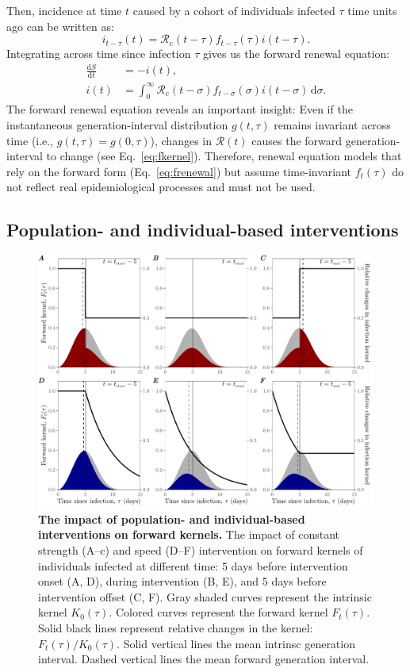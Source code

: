 \documentclass[12pt]{article}
\newcommand{\eref}[1]{Eq.~\ref{eq:#1}}
\newcommand{\Rx}[1]{\ensuremath{{\mathcal R}_{#1}}\xspace}
\newcommand{\Rc}{\Rx{\mathrm{c}}}
\newcommand{\RR}{\ensuremath{{\mathcal R}}\xspace}
\newcommand{\dd}[1]{\ensuremath{\, \mathrm{d}#1}}
\newcommand{\dsigma}{\dd{\sigma}}
\begin{document}
Then, incidence at time $t$ caused by a cohort of individuals infected $\tau$ time units ago can be written as:
\begin{equation}
i_{t-\tau}(t) = \Rc(t-\tau) f_{t-\tau}(\tau) i(t-\tau).
\end{equation}
Integrating across time since infection $\tau$ gives us the forward renewal equation:
\begin{align}
\frac{\mathrm{d}S}{\mathrm{d}t} &= - i(t),\\
i(t) &= \int_0^\infty \Rc(t-\sigma) f_{t-\sigma}(\sigma) i(t-\sigma) \dsigma.
\label{eq:frenewal}
\end{align}
The forward renewal equation reveals an important insight: Even if the instantaneous generation-interval distribution $g(t, \tau)$ remains invariant across time (i.e., $g(t, \tau) = g(0, \tau)$), changes in $\RR(t)$ causes the forward generation-interval to change (see \eref{fkernel}).
Therefore, renewal equation models that rely on the forward form (\eref{frenewal}) but assume time-invariant $f_t(\tau)$ do not reflect real epidemiological processes and must not be used.

\subsection{Population- and individual-based interventions}

\begin{figure}[!th]
\includegraphics[width=1\textwidth]{pop_ind_compare.pdf}
\caption{
\textbf{The impact of population- and individual-based interventions on forward kernels.}
The impact of constant strength (A--c) and speed (D--F) intervention on forward kernels of individuals infected at different time:
5 days before intervention onset (A, D), during intervention (B, E), and 5 days before intervention offset (C, F).
Gray shaded curves represent the intrinsic kernel $K_0(\tau)$.
Colored curves represent the forward kernel $F_t(\tau)$.
Solid black lines represent relative changes in the kernel: $F_t(\tau)/K_0(\tau)$.
Solid vertical lines the mean intrinsc generation interval.
Dashed vertical lines the mean forward generation interval.
}
\label{fig:indpop}
\end{figure}
\end{document}
